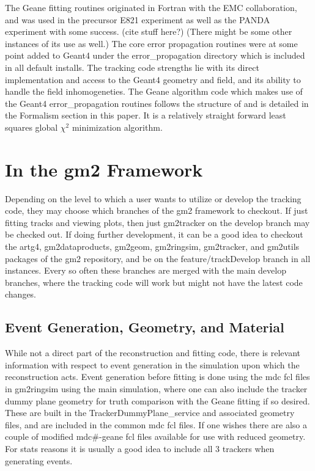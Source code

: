 \documentclass{article}
\begin{document}
  The Geane fitting routines originated in Fortran with the EMC collaboration, and was used in the precursor E821 experiment as well as the PANDA experiment with some success. (cite stuff here?) (There might be some other instances of its use as well.) The core error propagation routines were at some point added to Geant4 under the error\_propagation directory which is included in all default installs. The tracking code strengths lie with its direct implementation and access to the Geant4 geometry and field, and its ability to handle the field inhomogeneties. The Geane algorithm code which makes use of the Geant4 error\_propagation routines follows the structure of \cite{geanemanual} and is detailed in the Formalism section in this paper. It is a relatively straight forward least squares global $\chi^{2}$ minimization algorithm. 





\section{In the gm2 Framework}

  Depending on the level to which a user wants to utilize or develop the tracking code, they may choose which branches of the gm2 framework to checkout. If just fitting tracks and viewing plots, then just gm2tracker on the develop branch may be checked out. If doing further development, it can be a good idea to checkout the artg4, gm2dataproducts, gm2geom, gm2ringsim, gm2tracker, and gm2utils packages of the gm2 repository, and be on the feature/trackDevelop branch in all instances. Every so often these branches are merged with the main develop branches, where the tracking code will work but might not have the latest code changes. 

  \subsection{Event Generation, Geometry, and Material}

    While not a direct part of the reconstruction and fitting code, there is relevant information with respect to event generation in the simulation upon which the reconstruction acts. Event generation before fitting is done using the mdc fcl files in gm2ringsim using the main simulation, where one can also include the tracker dummy plane geometry for truth comparison with the Geane fitting if so desired. These are built in the TrackerDummyPlane\_service and associated geometry files, and are included in the common mdc fcl files. If one wishes there are also a couple of modified mdc\#-geane fcl files available for use with reduced geometry. For stats reasons it is usually a good idea to include all 3 trackers when generating events.
\end{document}
